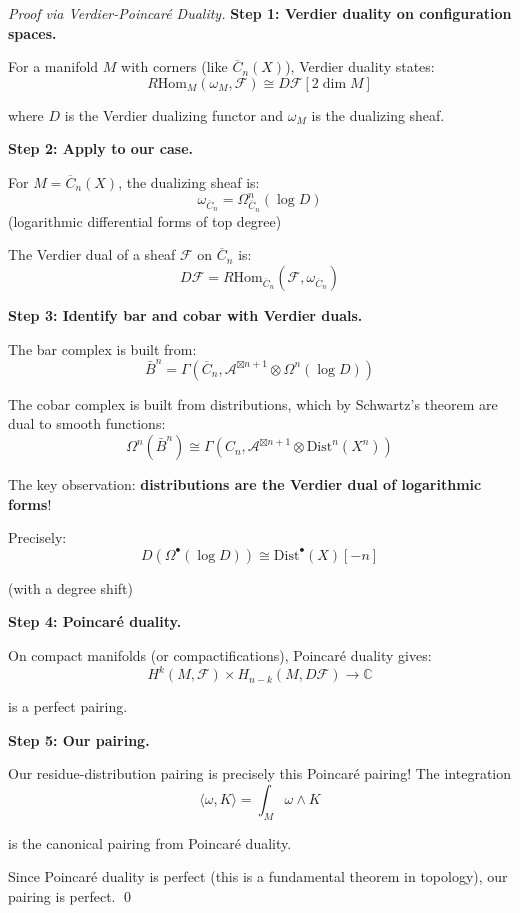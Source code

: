 \begin{proof}[Proof via Verdier-Poincaré Duality]
\textbf{Step 1: Verdier duality on configuration spaces.}

For a manifold $M$ with corners (like $\overline{C}_n(X)$), Verdier duality states:
$$R\text{Hom}_M(\omega_M, \mathcal{F}) \cong D\mathcal{F}[2\dim M]$$

where $D$ is the Verdier dualizing functor and $\omega_M$ is the dualizing sheaf.

\textbf{Step 2: Apply to our case.}

For $M = \overline{C}_n(X)$, the dualizing sheaf is:
$$\omega_{\overline{C}_n} = \Omega^n_{\overline{C}_n}(\log D)$$
(logarithmic differential forms of top degree)

The Verdier dual of a sheaf $\mathcal{F}$ on $\overline{C}_n$ is:
$$D\mathcal{F} = R\text{Hom}_{\overline{C}_n}(\mathcal{F}, \omega_{\overline{C}_n})$$

\textbf{Step 3: Identify bar and cobar with Verdier duals.}

The bar complex is built from:
$$\bar{B}^n = \Gamma(\overline{C}_n, \mathcal{A}^{\boxtimes n+1} \otimes \Omega^n(\log D))$$

The cobar complex is built from distributions, which by Schwartz's theorem are dual to
smooth functions:
$$\Omega^n(\bar{B}^n) \cong \Gamma(C_n, \mathcal{A}^{\boxtimes n+1} \otimes \text{Dist}^n(X^n))$$

The key observation: \textbf{distributions are the Verdier dual of logarithmic forms}!

Precisely:
$$D(\Omega^{\bullet}(\log D)) \cong \text{Dist}^{\bullet}(X)[-n]$$

(with a degree shift)

\textbf{Step 4: Poincaré duality.}

On compact manifolds (or compactifications), Poincaré duality gives:
$$H^k(M, \mathcal{F}) \times H_{n-k}(M, D\mathcal{F}) \to \mathbb{C}$$

is a perfect pairing.

\textbf{Step 5: Our pairing.}

Our residue-distribution pairing is precisely this Poincaré pairing! The integration
$$\langle \omega, K \rangle = \int_M \omega \wedge K$$

is the canonical pairing from Poincaré duality.

Since Poincaré duality is perfect (this is a fundamental theorem in topology), our
pairing is perfect.
\qed
\end{proof}

